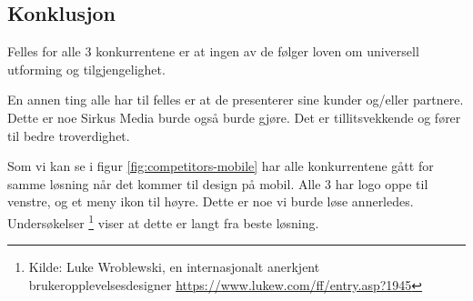\subsection{Konklusjon}
Felles for alle 3 konkurrentene er at ingen av de følger loven om universell utforming og tilgjengelighet.

En annen ting alle har til felles er at de presenterer sine kunder og/eller partnere. Dette er noe Sirkus Media burde også burde gjøre. Det er tillitsvekkende og fører til bedre troverdighet.

Som vi kan se i figur \ref{fig:competitors-mobile} har alle konkurrentene gått for samme løsning når det kommer til design på mobil. Alle 3 har logo oppe til venstre, og et meny ikon til høyre.
Dette er noe vi burde løse annerledes. Undersøkelser \footnote{Kilde: Luke Wroblewski, en internasjonalt anerkjent brukeropplevelsesdesigner \url{https://www.lukew.com/ff/entry.asp?1945}} viser at dette er langt fra beste løsning.


